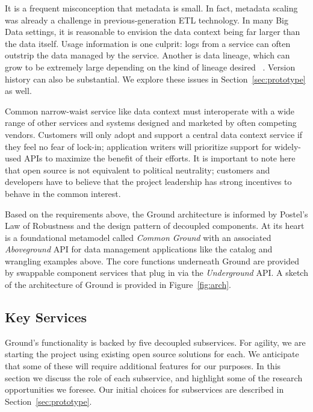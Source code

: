 \documentclass{sig-alternate}
\begin{document}
 It is a frequent misconception that metadata is small. In fact, metadata scaling was already a challenge in previous-generation ETL technology. In many Big Data settings, it is reasonable to envision the data context being far larger than the data itself. Usage information is one culprit:  logs from a service can often outstrip the data managed by the service. Another is data lineage, which can grow to be extremely large
depending on the kind of lineage desired
~\cite{cheney2009provenance}.  Version history can also be substantial. 
We explore these issues in Section~\ref{sec:prototype} as well.

Common narrow-waist service like data context must interoperate with a wide range of other services and systems designed and marketed by often competing vendors.
Customers will only adopt and support a central data context service if they feel no fear of lock-in; application writers will prioritize support for widely-used APIs to maximize the benefit of their efforts. 
It is important to note here that open source is not equivalent to political neutrality; customers and developers have to believe that the project leadership has strong incentives to behave in the common interest. 

\vspace{1em}
Based on the requirements above, the Ground architecture is informed by Postel's Law of Robustness and the design pattern of decoupled components. 
At its heart is a foundational metamodel called \emph{Common Ground} with an associated \emph{Aboveground} API for data management applications like the catalog and wrangling examples above. 
The core functions underneath Ground are provided by swappable component services that plug in via the \emph{Underground} API. 
A sketch of the architecture of Ground is provided in Figure~\ref{fig:arch}.


\subsection{Key Services}
Ground's functionality is backed by five decoupled subservices.  For agility, we are starting the project using existing open source solutions for each.  We anticipate that some of these will require additional features for our purposes. In this section we discuss the role of each subservice, and highlight some of the research opportunities we foresee.  Our initial choices for subservices are described in Section~\ref{sec:prototype}.
\end{document}
